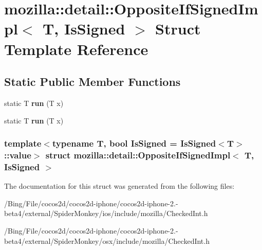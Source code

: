 \hypertarget{structmozilla_1_1detail_1_1_opposite_if_signed_impl}{\section{mozilla\-:\-:detail\-:\-:Opposite\-If\-Signed\-Impl$<$ T, Is\-Signed $>$ Struct Template Reference}
\label{structmozilla_1_1detail_1_1_opposite_if_signed_impl}
}
\subsection*{Static Public Member Functions}
\begin{DoxyCompactItemize}
\item 
\hypertarget{structmozilla_1_1detail_1_1_opposite_if_signed_impl_a959c941dab7b69abc2cc5a327041ccce}{static T {\bfseries run} (T x)}\label{structmozilla_1_1detail_1_1_opposite_if_signed_impl_a959c941dab7b69abc2cc5a327041ccce}

\item 
\hypertarget{structmozilla_1_1detail_1_1_opposite_if_signed_impl_a959c941dab7b69abc2cc5a327041ccce}{static T {\bfseries run} (T x)}\label{structmozilla_1_1detail_1_1_opposite_if_signed_impl_a959c941dab7b69abc2cc5a327041ccce}

\end{DoxyCompactItemize}
\subsubsection*{template$<$typename T, bool Is\-Signed = Is\-Signed$<$\-T$>$\-::value$>$ struct mozilla\-::detail\-::\-Opposite\-If\-Signed\-Impl$<$ T, Is\-Signed $>$}



The documentation for this struct was generated from the following files\-:\begin{DoxyCompactItemize}
\item 
/\-Bing/\-File/cocos2d/cocos2d-\/iphone/cocos2d-\/iphone-\/2.-\/beta4/external/\-Spider\-Monkey/ios/include/mozilla/Checked\-Int.\-h\item 
/\-Bing/\-File/cocos2d/cocos2d-\/iphone/cocos2d-\/iphone-\/2.-\/beta4/external/\-Spider\-Monkey/osx/include/mozilla/Checked\-Int.\-h\end{DoxyCompactItemize}
